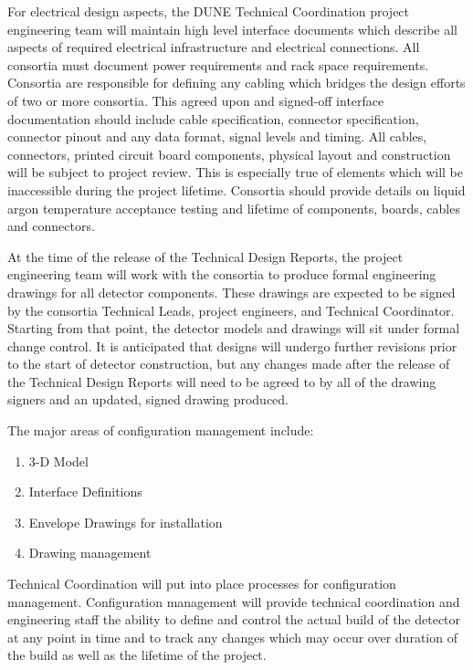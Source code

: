 For electrical design aspects, the DUNE Technical Coordination project
engineering team will maintain high level interface documents which
describe all aspects of required electrical infrastructure and
electrical connections.  All consortia must document power
requirements and rack space requirements.  Consortia are responsible
for defining any cabling which bridges the design efforts of two or
more consortia.  This agreed upon and signed-off interface
documentation should include cable specification, connector
specification, connector pinout and any data format, signal levels and
timing.  All cables, connectors, printed circuit board components,
physical layout and construction will be subject to project review.
This is especially true of elements which will be inaccessible during
the project lifetime.  Consortia should provide details on liquid
argon temperature acceptance testing and lifetime of components,
boards, cables and connectors.


At the time of the release of the Technical Design Reports, the
project engineering team will work with the consortia to produce
formal engineering drawings for all detector components.  These
drawings are expected to be signed by the consortia Technical Leads,
project engineers, and Technical Coordinator.  Starting from that
point, the detector models and drawings will sit under formal change
control.  It is anticipated that designs will undergo further
revisions prior to the start of detector construction, but any changes
made after the release of the Technical Design Reports will need to be
agreed to by all of the drawing signers and an updated, signed drawing
produced.

The major areas of configuration management include:
\begin{enumerate}
  \item 3-D Model
  \item Interface Definitions
  \item Envelope Drawings for installation
  \item Drawing management
\end{enumerate}

\label{ssec:fdsp-coord-integ-cnfg-mgmt}

Technical Coordination will put into place processes for
configuration management.  Configuration management will provide
technical coordination and engineering staff the ability to define and
control the actual build of the detector at any point in time and to
track any changes which may occur over duration of the build as well
as the lifetime of the project.

